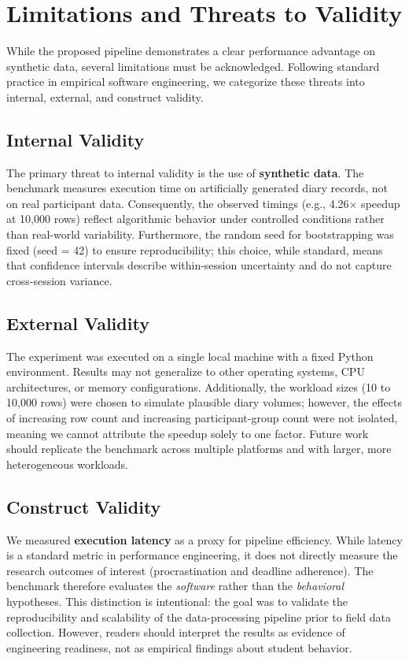\section{Limitations and Threats to Validity}
\label{sec:limitations}

While the proposed pipeline demonstrates a clear performance advantage on synthetic data, several limitations must be acknowledged. Following standard practice in empirical software engineering, we categorize these threats into internal, external, and construct validity.

\subsection{Internal Validity}
The primary threat to internal validity is the use of \textbf{synthetic data}. The benchmark measures execution time on artificially generated diary records, not on real participant data. Consequently, the observed timings (e.g., 4.26$\times$ speedup at 10,000 rows) reflect algorithmic behavior under controlled conditions rather than real-world variability. Furthermore, the random seed for bootstrapping was fixed (seed = 42) to ensure reproducibility; this choice, while standard, means that confidence intervals describe within-session uncertainty and do not capture cross-session variance.

\subsection{External Validity}
The experiment was executed on a single local machine with a fixed Python environment. Results may not generalize to other operating systems, CPU architectures, or memory configurations. Additionally, the workload sizes (10 to 10,000 rows) were chosen to simulate plausible diary volumes; however, the effects of increasing row count and increasing participant-group count were not isolated, meaning we cannot attribute the speedup solely to one factor. Future work should replicate the benchmark across multiple platforms and with larger, more heterogeneous workloads.

\subsection{Construct Validity}
We measured \textbf{execution latency} as a proxy for pipeline efficiency. While latency is a standard metric in performance engineering, it does not directly measure the research outcomes of interest (procrastination and deadline adherence). The benchmark therefore evaluates the \textit{software} rather than the \textit{behavioral} hypotheses. This distinction is intentional: the goal was to validate the reproducibility and scalability of the data-processing pipeline prior to field data collection. However, readers should interpret the results as evidence of engineering readiness, not as empirical findings about student behavior.

